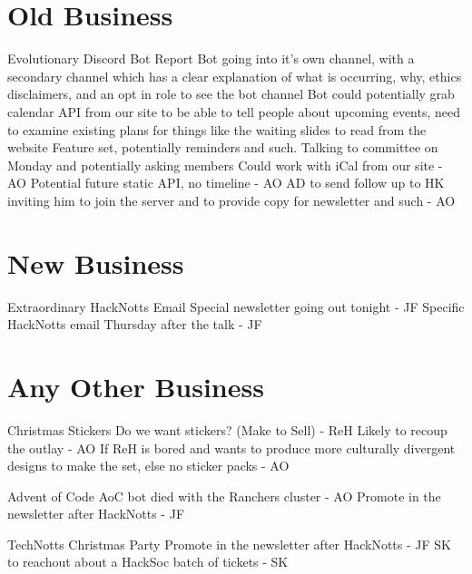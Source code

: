 \documentclass[11pt,hacksoc]{meetingmins}
\begin{document}
\section{Old Business}
\begin{items}
\item Evolutionary Discord Bot
\subitem Report
\subsubitem Bot going into it's own channel, with a secondary channel which has a clear explanation of what is occurring, why, ethics disclaimers, and an opt in role to see the bot channel
\subsubitem Bot could potentially grab calendar API from our site to be able to tell people about upcoming events, need to examine existing plans for things like the waiting slides to read from the website
\subsubitem Feature set, potentially reminders and such. Talking to committee on Monday and potentially asking members
\subitem Could work with iCal from our site - AO
\subitem Potential future static API, no timeline - AO
\subitem AD to send follow up to HK inviting him to join the server and to provide copy for newsletter and such - AO
\end{items}

\section{New Business}
\begin{items}
\item Extraordinary HackNotts Email
\subitem Special newsletter going out tonight - JF
\subitem Specific HackNotts email Thursday after the talk - JF
\end{items}
  

\section{Any Other Business}
\begin{items}
\item Christmas Stickers
\subitem Do we want stickers? (Make to Sell) - ReH
\subitem Likely to recoup the outlay - AO
\subitem If ReH is bored and wants to produce more culturally divergent designs to make the set, else no sticker packs - AO
\item Advent of Code 
\subitem AoC bot died with the Ranchers cluster - AO
\subitem Promote in the newsletter after HackNotts - JF
\item TechNotts Christmas Party
\subitem Promote in the newsletter after HackNotts - JF
\subitem SK to reachout about a HackSoc batch of tickets - SK
\end{items}

\vspace{1em}
\end{document}
